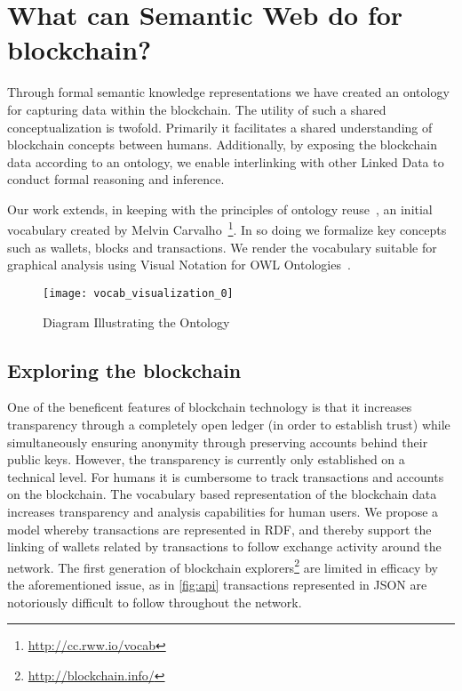 \section{What can Semantic Web do for blockchain?}

Through formal semantic knowledge representations we have created an ontology for capturing data within the blockchain.
The utility of such a shared conceptualization is twofold.
Primarily it facilitates a shared understanding of blockchain concepts between humans.
Additionally, by exposing the blockchain data according to an ontology, we enable interlinking with other Linked Data to conduct formal reasoning and inference. 

Our work extends, in keeping with the principles of ontology reuse~\cite{grangel2015Convention}, an initial vocabulary created by Melvin Carvalho~\cite{melvincarvalho2013}\footnote{\url{http://cc.rww.io/vocab}}. In so doing we formalize key concepts such as wallets, blocks and transactions.
We render the vocabulary suitable for graphical analysis using Visual Notation for OWL Ontologies~\cite{VOWL2}.

\begin{figure}[tb]
   \center 
   \texttt{[image: vocab\_visualization\_0]}
   \caption{Diagram Illustrating the Ontology} 
   \label{fig:viz}
\end{figure} 


\subsection{Exploring the blockchain}

One of the beneficent features of blockchain technology is that it increases transparency through a completely open ledger (in order to establish trust) while simultaneously ensuring anonymity through preserving accounts behind their public keys.
However, the transparency is currently only established on a technical level.
For humans it is cumbersome to track transactions and accounts on the blockchain.
The vocabulary based representation of the blockchain data increases transparency and analysis capabilities for human users.
We propose a model whereby transactions are represented in RDF, and thereby support the linking of wallets related by transactions to follow exchange activity around the network.
The first generation of blockchain explorers\footnote{\url{http://blockchain.info/}} are limited in efficacy by the aforementioned issue, as in \autoref{fig:api} transactions represented in JSON are notoriously difficult to follow throughout the network.

